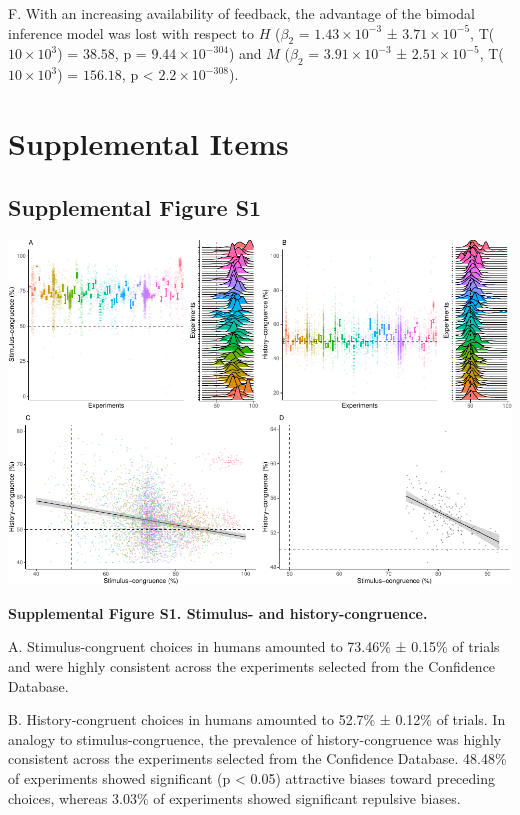\documentclass[
]{article}
\begin{document}
F. With an increasing availability of feedback, the advantage of the
bimodal inference model was lost with respect to \(H\) (\(\beta_2\) =
\(\ensuremath{1.43\times 10^{-3}}\) ±
\(\ensuremath{3.71\times 10^{-5}}\), T(\(\ensuremath{10\times 10^{3}}\))
= \(38.58\), p = \(\ensuremath{9.44\times 10^{-304}}\)) and \(M\)
(\(\beta_2\) = \(\ensuremath{3.91\times 10^{-3}}\) ±
\(\ensuremath{2.51\times 10^{-5}}\), T(\(\ensuremath{10\times 10^{3}}\))
= \(156.18\), p < \(\ensuremath{2.2\times 10^{-308}}\)).

\newpage

\hypertarget{supplemental-items}{%
\section{Supplemental Items}\label{supplemental-items}}

\hypertarget{supplemental-figure-s1}{%
\subsection{Supplemental Figure S1}\label{supplemental-figure-s1}}

\includegraphics{modes_mouse_files/figure-latex/Supplememtal_Figure_S1-1.pdf}

\textbf{Supplemental Figure S1. Stimulus- and history-congruence.}

A. Stimulus-congruent choices in humans amounted to 73.46\% ± 0.15\% of
trials and were highly consistent across the experiments selected from
the Confidence Database.

B. History-congruent choices in humans amounted to 52.7\% ± 0.12\% of
trials. In analogy to stimulus-congruence, the prevalence of
history-congruence was highly consistent across the experiments selected
from the Confidence Database. 48.48\% of experiments showed significant
(p \textless{} 0.05) attractive biases toward preceding choices, whereas
3.03\% of experiments showed significant repulsive biases.
\end{document}
